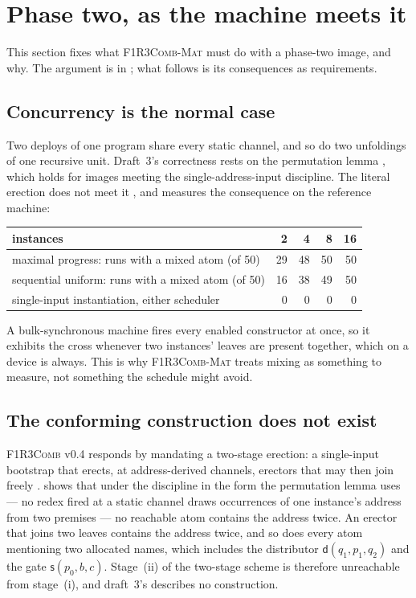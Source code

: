 \documentclass[11pt,a4paper]{article}
\newcommand{\Comb}{\textsc{F1R3Comb}}
\newcommand{\Mat}{\textsc{F1R3Comb-Mat}}
\newcommand{\dd}{\mathsf{d}}
\newcommand{\sy}{\mathsf{s}}
\theoremstyle{definition}
\theoremstyle{plain}
\begin{document}
\section{Phase two, as the machine meets it}\label{sec:phase2}

This section fixes what \Mat{} must do with a phase-two image, and why. The
argument is in \cite[\S14]{matnote}; what follows is its consequences as
requirements.

\subsection{Concurrency is the normal case}

Two deploys of one program share every static channel, and so do two
unfoldings of one recursive unit. Draft~3's correctness rests on the
permutation lemma \cite[Lem.~6.11]{draft3}, which holds for images meeting the
single-address-input discipline. The literal erection does not meet it
\cite[Req.~5.15]{combspec}, and \cite[Find.~14.1]{matnote} measures the
consequence on the reference machine:

\begin{center}\small
\begin{tabular}{@{}lrrrr@{}}
\toprule
instances & 2 & 4 & 8 & 16\\
\midrule
maximal progress: runs with a mixed atom (of 50) & 29 & 48 & 50 & 50\\
sequential uniform: runs with a mixed atom (of 50) & 16 & 38 & 49 & 50\\
single-input instantiation, either scheduler & 0 & 0 & 0 & 0\\
\bottomrule
\end{tabular}
\end{center}

\noindent
A bulk-synchronous machine fires every enabled constructor at once, so it
exhibits the cross whenever two instances' leaves are present together, which
on a device is always. This is why \Mat{} treats mixing as something to
measure, not something the schedule might avoid.

\subsection{The conforming construction does not exist}

\Comb{} v0.4 responds by mandating a two-stage erection: a single-input
bootstrap that erects, at address-derived channels, erectors that may then
join freely \cite[Req.~5.16]{combspec}. \cite[Prop.~14.3]{matnote} shows that
under the discipline in the form the permutation lemma uses --- no redex fired
at a static channel draws occurrences of one instance's address from two
premises --- no reachable atom contains the address twice. An erector that
joins two leaves contains the address twice, and so does every atom
mentioning two allocated names, which includes the distributor
$\dd(q_{1},p_{1},q_{2})$ and the gate $\sy(p_{0},b,c)$. Stage~(ii) of the
two-stage scheme is therefore unreachable from stage~(i), and draft~3's
\cite[Rem.~6.12]{draft3} describes no construction.
\end{document}
